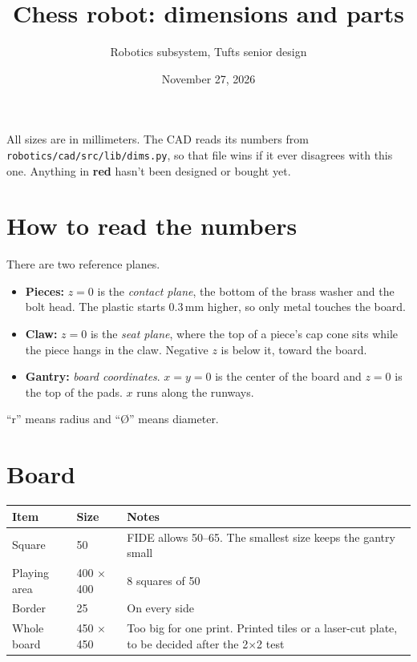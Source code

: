 \documentclass[10pt]{article}
\title{\color{accent}\textbf{Chess robot: dimensions and parts}}
\author{Robotics subsystem, Tufts senior design}
\date{November 27, 2026}
\newcommand{\mm}{\,mm}
\newcommand{\file}[1]{\texttt{#1}}
\begin{document}
\maketitle
\vspace{-1.5em}

\begin{center}
\begin{minipage}{0.9\textwidth}
\small\color{muted}
All sizes are in millimeters. The CAD reads its numbers from \file{robotics/cad/src/lib/dims.py},
so that file wins if it ever disagrees with this one. Anything in \textcolor{red!70!black}{\textbf{red}}
hasn't been designed or bought yet.
\end{minipage}
\end{center}

\setcounter{tocdepth}{1}
\tableofcontents

\section{How to read the numbers}

There are two reference planes.
\begin{itemize}
  \item \textbf{Pieces:} $z = 0$ is the \emph{contact plane}, the bottom of the brass washer and the
        bolt head. The plastic starts 0.3\mm{} higher, so only metal touches the board.
  \item \textbf{Claw:} $z = 0$ is the \emph{seat plane}, where the top of a piece's cap cone sits
        while the piece hangs in the claw. Negative $z$ is below it, toward the board.
  \item \textbf{Gantry:} \emph{board coordinates}. $x = y = 0$ is the center of the board and $z = 0$
        is the top of the pads. $x$ runs along the runways.
\end{itemize}
``r'' means radius and ``\O'' means diameter.

\section{Board}

\begin{tabularx}{\textwidth}{l l L}
\toprule
Item & Size & Notes \\
\midrule
Square & 50 & FIDE allows 50--65. The smallest size keeps the gantry small \\
Playing area & 400 $\times$ 400 & 8 squares of 50 \\
Border & 25 & On every side \\
Whole board & 450 $\times$ 450 & Too big for one print. Printed tiles or a laser-cut plate, to be decided after the 2$\times$2 test \\
\bottomrule
\end{tabularx}
\end{document}
